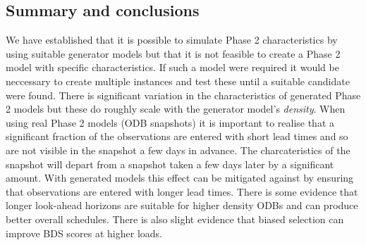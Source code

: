 \subsection{Summary and conclusions}

We have established that it is possible to simulate Phase 2 characteristics by using suitable generator models but that it is not feasible to create a Phase 2 model with specific characteristics. If such a model were required it would be neccessary to create multiple instances and test these until a suitable candidate were found. There is significant variation in the characteristics of generated  Phase 2 models but these do roughly scale with the generator model's \emph{density}. When using real Phase 2 models (ODB snapshots) it is important to realise that a significant fraction of the observations are entered with short lead times and so are not visible in the snapshot a few days in advance. The charcateristics of the snapshot will depart from a snapshot taken a few days later by a significant amount. With generated models this effect can be mitigated against by ensuring that observations are entered with longer lead times. There is some evidence that longer look-ahead horizons are suitable for higher density ODBs and can produce better overall schedules. There is also slight evidence that biased selection can improve BDS scores at higher loads.

